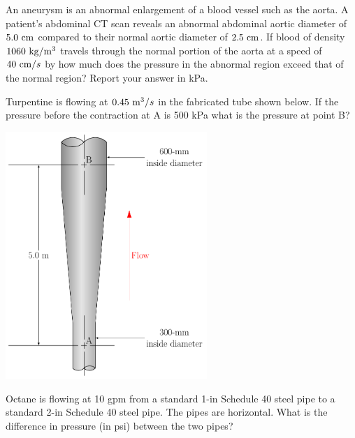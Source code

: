 \documentclass[multi,preview,varwidth=false,border=5,12pt]{standalone}
\begin{document}
\begin{question}

An aneurysm is an abnormal enlargement of a blood vessel such as the aorta.  A  patient's abdominal CT scan reveals an abnormal abdominal aortic diameter of $5.0~\mathrm{cm}$ compared to their normal aortic diameter of $2.5~\mathrm{cm}$.  If blood of density $1060~\mathrm{kg}/\mathrm{m}^3$ travels through the normal portion of the aorta at a speed of $40~\mathrm{cm}/s$ by how much does the pressure in the abnormal region exceed that of the normal region?  Report your answer in kPa.

\begin{solution}
\end{solution}

\end{question}



\begin{question}

Turpentine is flowing at $0.45~\mathrm{m}^3/s$ in the fabricated tube shown below.  If the pressure before the contraction at A is 500 kPa what is the pressure at point B?

\includegraphics[width=3in]{imgs/PipeExp1.pdf}


\begin{solution}
\end{solution}

\end{question}


\begin{question}

Octane is flowing at 10 gpm from a standard 1-in Schedule 40 steel pipe to a standard 2-in Schedule 40 steel pipe.  The pipes are horizontal.  What is the difference in pressure (in psi) between the two pipes?

\begin{solution}
\end{solution}

\end{question}
\end{document}
